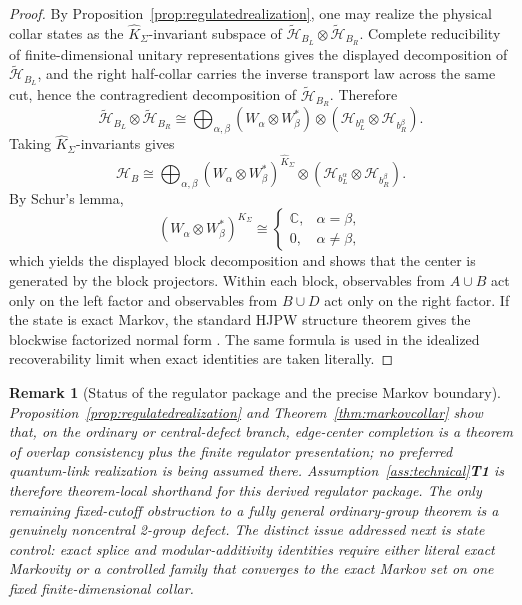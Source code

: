 \documentclass[11pt]{article}
\newtheorem{remark}[theorem]{Remark}
\begin{document}
\begin{proof}
By Proposition~\ref{prop:regulatedrealization}, one may realize the physical collar states as the \(\widehat K_\Sigma\)-invariant subspace of \(\tilde{\mathcal H}_{B_L}\otimes \tilde{\mathcal H}_{B_R}\). Complete reducibility of finite-dimensional unitary representations gives the displayed decomposition of \(\tilde{\mathcal H}_{B_L}\), and the right half-collar carries the inverse transport law across the same cut, hence the contragredient decomposition of \(\tilde{\mathcal H}_{B_R}\). Therefore
\[
\tilde{\mathcal H}_{B_L}\otimes \tilde{\mathcal H}_{B_R}
\cong
\bigoplus_{\alpha,\beta}
(W_\alpha\otimes W_\beta^*)\otimes
(\mathcal H_{b_L^\alpha}\otimes \mathcal H_{b_R^\beta}).
\]
Taking \(\widehat K_\Sigma\)-invariants gives
\[
\mathcal H_B
\cong
\bigoplus_{\alpha,\beta}
(W_\alpha\otimes W_\beta^*)^{\widehat K_\Sigma}\otimes
(\mathcal H_{b_L^\alpha}\otimes \mathcal H_{b_R^\beta}).
\]
By Schur's lemma,
\[
(W_\alpha\otimes W_\beta^*)^{\widehat K_\Sigma}
\cong
\begin{cases}
\mathbb C, & \alpha=\beta,\\
0, & \alpha\neq \beta,
\end{cases}
\]
which yields the displayed block decomposition and shows that the center is generated by the block projectors. Within each block, observables from \(A\cup B\) act only on the left factor and observables from \(B\cup D\) act only on the right factor. If the state is exact Markov, the standard HJPW structure theorem gives the blockwise factorized normal form \cite{HJPW}. The same formula is used in the idealized recoverability limit when exact identities are taken literally.
\end{proof}

\begin{remark}[Status of the regulator package and the precise Markov boundary]
Proposition~\ref{prop:regulatedrealization} and Theorem~\ref{thm:markovcollar} show that, on the ordinary or central-defect branch, edge-center completion is a theorem of overlap consistency plus the finite regulator presentation; no preferred quantum-link realization is being assumed there. Assumption~\ref{ass:technical}\textbf{T1} is therefore theorem-local shorthand for this derived regulator package. The only remaining fixed-cutoff obstruction to a fully general ordinary-group theorem is a genuinely noncentral 2-group defect. The distinct issue addressed next is \emph{state} control: exact splice and modular-additivity identities require either literal exact Markovity or a controlled family that converges to the exact Markov set on one fixed finite-dimensional collar.
\end{remark}
\end{document}
